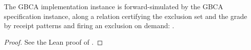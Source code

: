 \begin{theorem}
  \label{thm:gbca-implementation-refines-specification}
  \leanok
  The GBCA implementation instance is forward-simulated by the GBCA specification instance, along a relation certifying the exclusion set and the grade by receipt patterns and firing an exclusion on demand: .
\end{theorem}

\begin{proof}\leanok
  See the Lean proof of .
\end{proof}
